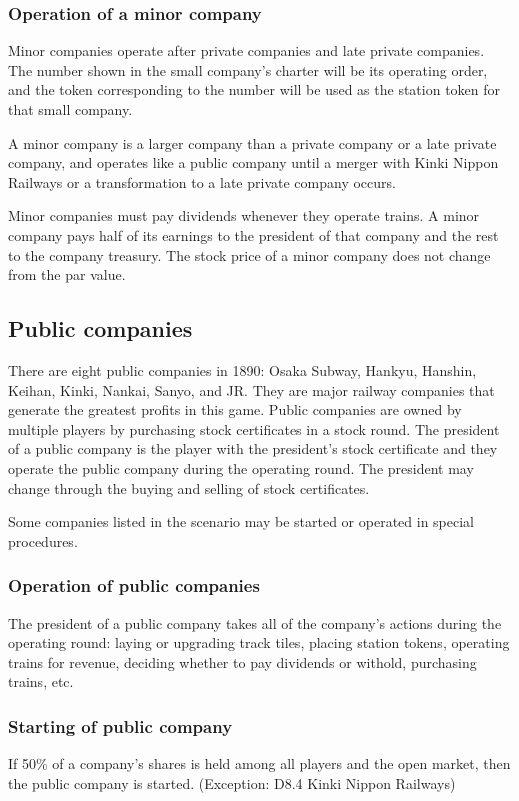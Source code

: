\documentclass{article}
\begin{document}
\begin{CJK}{UTF8}{min}
\begin{multicols}{2}
\subsubsection{Operation of a minor company}
Minor companies operate after private companies and late private
companies. The number shown in the small company's charter will be its
operating order, and the token corresponding to the number will be
used as the station token for that small company.

A minor company is a larger company than a private company or a late
private company, and operates like a public company until a merger
with Kinki Nippon Railways or a transformation to a late private
company occurs.

Minor companies must pay dividends whenever they operate trains. A
minor company pays half of its earnings to the president of that
company and the rest to the company treasury. The stock price of a
minor company does not change from the par value.

\subsection{Public companies}
There are eight public companies in 1890: Osaka Subway, Hankyu,
Hanshin, Keihan, Kinki, Nankai, Sanyo, and JR. They are major railway
companies that generate the greatest profits in this game. Public
companies are owned by multiple players by purchasing stock
certificates in a stock round. The president of a public company is
the player with the president's stock certificate and they operate the
public company during the operating round. The president may change
through the buying and selling of stock certificates.

Some companies listed in the scenario may be started or operated
in special procedures.

\subsubsection{Operation of public companies}
The president of a public company takes all of the company's actions
during the operating round: laying or upgrading track tiles, placing
station tokens, operating trains for revenue, deciding whether to pay
dividends or withold, purchasing trains, etc.

\subsubsection{Starting of public company}
If 50\% of a company's shares is held among all players and the open
market, then the public company is started. (Exception: D8.4 Kinki
Nippon Railways)


\end{multicols}
\end{CJK}
\end{document}
